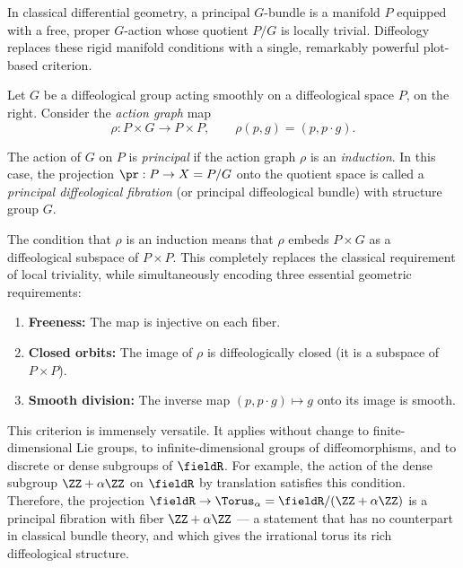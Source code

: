 \begin{article}
  \label{art:Principal Diffeological Fiber Bundles}
  
  In classical differential geometry,
  a principal $G$-bundle is a manifold $P$ equipped with a free,
  proper $G$-action whose quotient $P/G$ is locally trivial.
  Diffeology replaces these rigid manifold conditions
  with a single, remarkably powerful plot-based criterion.
  
  Let $G$ be a diffeological group acting smoothly on a diffeological space $P$,
  on the right.
  Consider the \emph{action graph} map
  \[
    \rho: P \times G \to P \times P,
    \qquad
    \rho(p,g) = (p, p \cdot g).
    \]
  
  \begin{definition}
    The action of $G$ on $P$ is \emph{principal} if the action graph $\rho$
    is an \emph{induction}.
    In this case,
    the projection $\pr: P \to X = P/G$ onto the quotient space
    is called a \emph{principal diffeological fibration}
    (or principal diffeological bundle) with structure group $G$.
  \end{definition}
  
  The condition that $\rho$ is an induction means that $\rho$ embeds
  $P \times G$ as a diffeological subspace of $P \times P$.
  This completely replaces the classical requirement of local triviality,
  while simultaneously encoding three essential geometric requirements:
  \begin{enumerate}
    \item \textbf{Freeness:} The map is injective on each fiber.
    \item \textbf{Closed orbits:} The image of $\rho$ is diffeologically closed
    (it is a subspace of $P \times P$).
    \item \textbf{Smooth division:} The inverse map $(p, p \cdot g) \mapsto g$
    onto its image is smooth.
  \end{enumerate}
  
  This criterion is immensely versatile.
  It applies without change to finite-dimensional Lie groups,
  to infinite-dimensional groups of diffeomorphisms,
  and to discrete or dense subgroups of $\fieldR$.
  For example,
  the action of the dense subgroup $\ZZ + \alpha\ZZ$ on $\fieldR$ by translation
  satisfies this condition.
  Therefore,
  the projection $\fieldR \to \Torus_\alpha = \fieldR/(\ZZ + \alpha\ZZ)$
  is a principal fibration with fiber $\ZZ + \alpha\ZZ$ ---
  a statement that has no counterpart in classical bundle theory,
  and which gives the irrational torus its rich diffeological structure.
  

\end{article}
